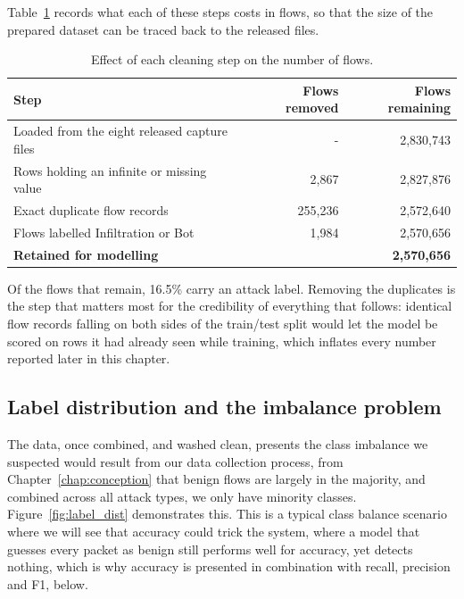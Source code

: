 Table~\ref{tab:cleaning_audit} records what each of these steps costs in flows, so that the size of the prepared dataset can be traced back to the released files.

\begin{table}[H]
  \centering
  \caption{Effect of each cleaning step on the number of flows.}
  \label{tab:cleaning_audit}
  \renewcommand{\arraystretch}{1.3}
  \begin{tabularx}{\textwidth}{Xrr}
    \toprule
    \textbf{Step} & \textbf{Flows removed} & \textbf{Flows remaining} \\
    \midrule
    Loaded from the eight released capture files & -       & 2,830,743 \\
    Rows holding an infinite or missing value    & 2,867   & 2,827,876 \\
    Exact duplicate flow records                 & 255,236 & 2,572,640 \\
    Flows labelled Infiltration or Bot           & 1,984   & 2,570,656 \\
    \midrule
    \textbf{Retained for modelling}              &         & \textbf{2,570,656} \\
    \bottomrule
  \end{tabularx}
\end{table}

Of the flows that remain, 16.5\% carry an attack label. Removing the duplicates is the step that matters most for the credibility of everything that follows: identical flow records falling on both sides of the train/test split would let the model be scored on rows it had already seen while training, which inflates every number reported later in this chapter.

\subsection{Label distribution and the imbalance problem}
\label{sec:results_imbalance}

The data, once combined, and washed clean, presents the class imbalance we suspected would result from our data collection process, from Chapter~\ref{chap:conception} that benign flows are largely in the majority, and combined across all attack types, we only have minority classes. Figure~\ref{fig:label_dist} demonstrates this. This is a typical class balance scenario where we will see that accuracy could trick the system, where a model that guesses every packet as benign still performs well for accuracy, yet detects nothing, which is why accuracy is presented in combination with recall, precision and F1, below.

